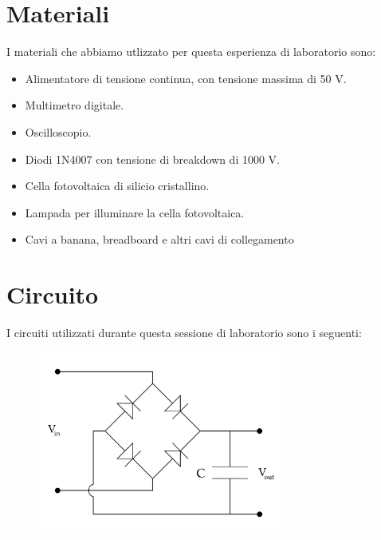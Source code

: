 \section*{Materiali}

I materiali che abbiamo utlizzato per questa esperienza di laboratorio sono:

\begin{itemize}
    \setlength{\itemsep}{0.5pt}
    \item{Alimentatore di tensione continua, con tensione massima di 50 V.}
    \item{Multimetro digitale.}
    \item{Oscilloscopio.}
    \item{Diodi 1N4007 con tensione di breakdown di 1000 V.}
    \item{Cella fotovoltaica di silicio cristallino.}
    \item{Lampada per illuminare la cella fotovoltaica.}
    \item{Cavi a banana, breadboard e altri cavi di collegamento}
\end{itemize}

\section*{Circuito}

I circuiti utilizzati durante questa sessione di laboratorio sono i seguenti:

\begin{figure}[h]
    \includegraphics[width=8cm]{graetz.pdf}
\end{figure}
